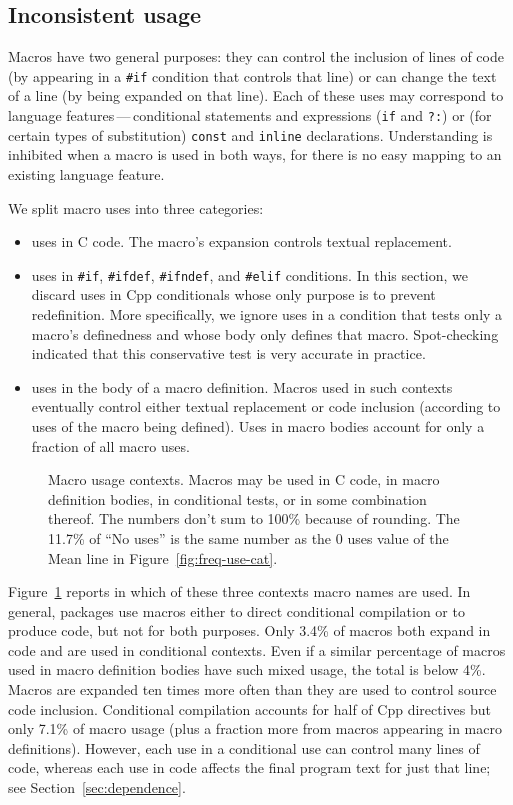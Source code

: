 \documentclass[10pt]{article}
\newcommand{\captionsmall}[1]{\caption[]{\small #1}}
\begin{document}
\subsection{Inconsistent usage}

Macros have two general purposes: they can control the inclusion of lines
of code (by appearing in a \texttt{\#if} condition that controls that line)
or can change the text of a line (by being expanded on that line).  Each of
these uses may correspond to language features\,---\,conditional statements
and expressions (\texttt{if} and {\tt ?:}) or (for certain types of
substitution) {\tt const} and {\tt inline} declarations.  Understanding is
inhibited when a macro is used in both ways, for there is no easy mapping
to an existing language feature.


We split macro uses into three categories:
\begin{itemize}\itemsep 0pt \parskip 0pt
\item uses in C code.   The macro's expansion controls textual
      replacement.
\item uses in \texttt{\#if}, \texttt{\#ifdef}, \texttt{\#ifndef}, and
  \texttt{\#elif} conditions.  In this section, we discard uses in Cpp
  conditionals whose only purpose is to prevent redefinition.  More
  specifically, we ignore uses in a condition that tests only a macro's
  definedness and whose body only defines that macro.  Spot-checking
  indicated that this conservative test is very accurate in practice.
\item uses in the body of a macro definition.
  Macros used in such contexts eventually control either textual
  replacement or code inclusion (according to uses of the macro being
  defined).  Uses in macro bodies account for only a fraction of all macro
  uses.
\end{itemize}

\begin{figure}
\centerline{\small
  \setlength{\tabcolsep}{.25em}
}
\captionsmall{Macro usage contexts.  Macros may be used in C code, in
  macro definition bodies, in conditional tests, or in some combination
  thereof.  The numbers don't sum to 100\% because of rounding.  The 11.7\%
  of ``No uses'' is the same number as the 0 uses value of the Mean line in
  Figure~\ref{fig:freq-use-cat}.}
\label{fig:where-used}
\end{figure}

Figure~\ref{fig:where-used} reports in which of these three contexts macro
names are used.  In general, packages use macros either to direct
conditional compilation or to produce code, but not for both purposes.
Only 3.4\% of macros both expand in code and are used in conditional
contexts.  Even if a similar percentage of macros used in macro definition
bodies have such mixed usage, the total is below 4\%.  Macros are expanded
ten times more often than they are used to control source code inclusion.
Conditional compilation accounts for half of Cpp directives but only 7.1\%
of macro usage (plus a fraction more from macros appearing in macro
definitions).  However, each use in a conditional use can control many
lines of code, whereas each use in code affects the final program text for
just that line; see Section~\ref{sec:dependence}.
\end{document}

